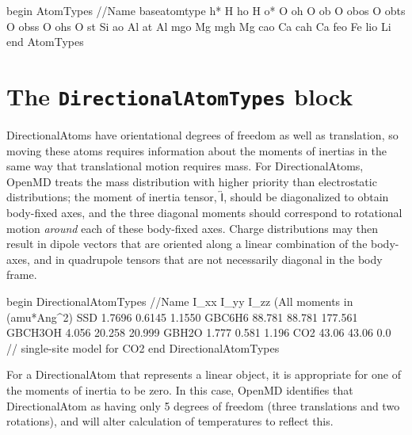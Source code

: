 \documentclass[letterpaper]{report}
\begin{document}
\begin{code}[caption={[An example of a AtomTypes block.] A
simple example of an AtomTypes block which
shows how multiple types can inherit from the same base type.},
label={sch:atomTypesBlock}]
begin AtomTypes    
//Name  baseatomtype
h*      H
ho      H
o*      O
oh      O
ob      O
obos    O
obts    O
obss    O
ohs     O
st      Si
ao      Al
at      Al
mgo     Mg
mgh     Mg
cao     Ca
cah     Ca
feo     Fe
lio     Li
end AtomTypes
\end{code}

\section{\label{section:ffDirectionalAtom}The {\tt DirectionalAtomTypes}
  block}
DirectionalAtoms have orientational degrees of freedom as well as
translation, so moving these atoms requires information about the
moments of inertias in the same way that translational motion requires
mass.  For DirectionalAtoms, OpenMD treats the mass distribution with
higher priority than electrostatic distributions; the moment of
inertia tensor, $\overleftrightarrow{\mathsf I}$, should be
diagonalized to obtain body-fixed axes, and the three diagonal moments
should correspond to rotational motion \textit{around} each of these
body-fixed axes.  Charge distributions may then result in dipole
vectors that are oriented along a linear combination of the body-axes,
and in quadrupole tensors that are not necessarily diagonal in the
body frame. 

\begin{code}[caption={[An example of a DirectionalAtomTypes block.] A
simple example of a DirectionalAtomTypes block.},
label={sch:datomTypesBlock}]
begin DirectionalAtomTypes
//Name          I_xx    I_yy    I_zz    (All moments in (amu*Ang^2)
SSD             1.7696  0.6145  1.1550  
GBC6H6          88.781  88.781  177.561
GBCH3OH         4.056   20.258  20.999
GBH2O           1.777   0.581   1.196
CO2             43.06   43.06   0.0    // single-site model for CO2
end DirectionalAtomTypes                    

\end{code}

For a DirectionalAtom that represents a linear object, it is
appropriate for one of the moments of inertia to be zero.  In this
case, OpenMD identifies that DirectionalAtom as having only 5 degrees
of freedom (three translations and two rotations), and will alter
calculation of temperatures to reflect this.
\end{document}
